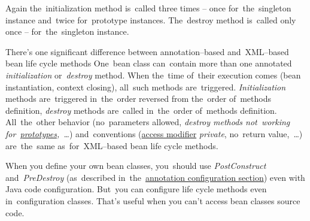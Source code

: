 
\noindent Again the~initialization method is~called three times -- once for~the~singleton instance and~twice for~prototype instances.
The~destroy method is~called only once -- for~the~singleton instance.

\note There's one significant difference between annotation--based and~XML--based bean life cycle methods  One~bean class can~contain more than one annotated \textit{initialization} or~\textit{destroy} method.
When the~time of~their execution comes (bean instantiation, context closing), all~such methods are~triggered.
\textit{Initialization} methods are~triggered in~the~order reversed from the~order of~methods definition, \textit{destroy} methods are~called in~the~order of~methods definition.
All~the~other behavior (no~parameters allowed, \textit{destroy methods not~working for~\hyperref[prototypedp]{prototypes},~\dots}) and~conventions (\hyperref[javaaccessmodifiers]{access modifier} \textit{private}, no~return value,~\dots) are~the~same as~for~XML--based bean life cycle methods.

When you define your own bean classes, you~should use \textit{PostConstruct} and~\textit{PreDestroy} (as~described in~the~\hyperref[beanlifecycleannotations]{annotation configuration section}) even with Java code configuration.
But~you can configure life cycle methods even in~configuration classes.
That's useful when you can't access bean classes source code.

